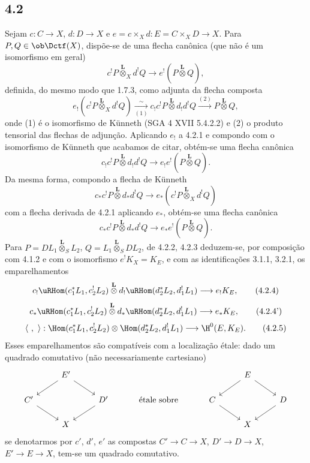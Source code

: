 \subsection*{4.2}
Sejam $c:C\to X$, $d:D\to X$ e $e=c\times_Xd:E=C\times_XD\to X$. Para $P,Q\in\ob\Dctf(X)$, dispõe-se de uma flecha canônica (que não é um isomorfismo em geral)
\begin{equation}
c^!P\overset{\mathbf L}{\otimes}_X d^!Q
\longrightarrow e^!(P\overset{\mathbf L}{\otimes}Q),
\tag{4.2.1}
\end{equation}
definida, do mesmo modo que 1.7.3, como adjunta da flecha composta
\[
e_!(c^!P\overset{\mathbf L}{\otimes}_X d^!Q)
\xrightarrow[(1)]{\sim}
 c_!c^!P\overset{\mathbf L}{\otimes}d_!d^!Q
\xrightarrow{(2)} P\overset{\mathbf L}{\otimes}Q,
\]
onde (1) é o isomorfismo de Künneth (SGA 4 XVII 5.4.2.2) e (2) o produto tensorial das flechas de adjunção. Aplicando $e_!$ a 4.2.1 e compondo com o isomorfismo de Künneth que acabamos de citar, obtém-se uma flecha canônica
\begin{equation}
c_!c^!P\overset{\mathbf L}{\otimes}d_!d^!Q
\longrightarrow e_!e^!(P\overset{\mathbf L}{\otimes}Q).
\tag{4.2.2}
\end{equation}
Da mesma forma, compondo a flecha de Künneth
\[
c_*c^!P\overset{\mathbf L}{\otimes}d_*d^!Q
\longrightarrow e_*(c^!P\overset{\mathbf L}{\otimes}_X d^!Q)
\]
com a flecha derivada de 4.2.1 aplicando $e_*$, obtém-se uma flecha canônica
\begin{equation}
c_*c^!P\overset{\mathbf L}{\otimes}d_*d^!Q
\longrightarrow e_*e^!(P\overset{\mathbf L}{\otimes}Q).
\tag{4.2.3}
\end{equation}
Para $P=DL_1\overset{\mathbf L}{\otimes}_S L_2$, $Q=L_1\overset{\mathbf L}{\otimes}_S DL_2$, de 4.2.2, 4.2.3 deduzem-se, por composição com 4.1.2 e com o isomorfismo $e^!K_X=K_E$, e com as identificações 3.1.1, 3.2.1, os emparelhamentos
\begin{equation}
c_!\uRHom(c_1^*L_1,c_2^!L_2)\overset{\mathbf L}{\otimes}
 d_!\uRHom(d_2^*L_2,d_1^!L_1)
\longrightarrow e_!K_E,
\tag{4.2.4}
\end{equation}
\begin{equation}
c_*\uRHom(c_1^*L_1,c_2^!L_2)\overset{\mathbf L}{\otimes}
 d_*\uRHom(d_2^*L_2,d_1^!L_1)
\longrightarrow e_*K_E,
\tag{4.2.4'}
\end{equation}
\begin{equation}
\langle\ ,\ \rangle:
\Hom(c_1^*L_1,c_2^!L_2)\otimes\Hom(d_2^*L_2,d_1^!L_1)
\longrightarrow \H^0(E,K_E).
\tag{4.2.5}
\end{equation}
Esses emparelhamentos são compatíveis com a localização étale: dado um quadrado comutativo (não necessariamente cartesiano)
\[
\begin{tikzcd}[column sep=2.5em,row sep=1.5em]
& E' \arrow[dl] \arrow[dr] & && & E \arrow[dl] \arrow[dr] & \\
C' \arrow[dr] && D' \arrow[dl] & \text{ étale sobre } & C \arrow[dr] && D \arrow[dl] \\
& X &&&& X &
\end{tikzcd}
\]
se denotarmos por $c'$, $d'$, $e'$ as compostas $C'\to C\to X$, $D'\to D\to X$, $E'\to E\to X$, tem-se um quadrado comutativo.


